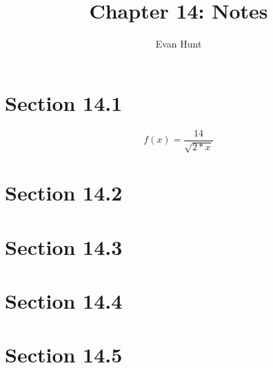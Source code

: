 \documentclass[12pt]{article}
\title{Chapter 14: Notes}
\author{Evan Hunt}
\begin{document}
    \maketitle

    \section[]{Section 14.1}
        \begin{equation}
            f(x) = \frac{14}{\sqrt{2*x}}
        \end{equation}
    \section[]{Section 14.2}
    \section[]{Section 14.3}
    \section[]{Section 14.4}
    \section[]{Section 14.5}
\end{document}
